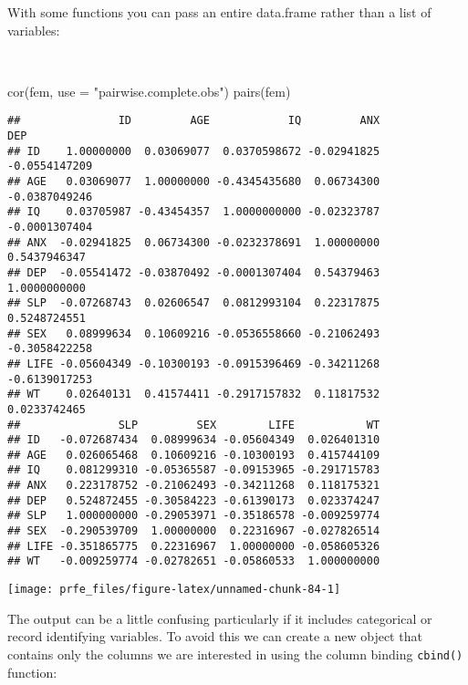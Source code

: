 \documentclass[
  12pt,
  a4paper]{book}
\newenvironment{Shaded}{\begin{snugshade}}{\end{snugshade}}
\newcommand{\AttributeTok}[1]{\textcolor[rgb]{0.77,0.63,0.00}{#1}}
\newcommand{\FunctionTok}[1]{\textcolor[rgb]{0.00,0.00,0.00}{#1}}
\newcommand{\NormalTok}[1]{#1}
\newcommand{\StringTok}[1]{\textcolor[rgb]{0.31,0.60,0.02}{#1}}
\begin{document}
\newpage

With some functions you can pass an entire data.frame rather than a list of variables:

~

\begin{Shaded}
\begin{Highlighting}[]
\FunctionTok{cor}\NormalTok{(fem, }\AttributeTok{use =} \StringTok{"pairwise.complete.obs"}\NormalTok{)}
\FunctionTok{pairs}\NormalTok{(fem)}
\end{Highlighting}
\end{Shaded}

\begin{verbatim}
##               ID         AGE            IQ         ANX           DEP
## ID    1.00000000  0.03069077  0.0370598672 -0.02941825 -0.0554147209
## AGE   0.03069077  1.00000000 -0.4345435680  0.06734300 -0.0387049246
## IQ    0.03705987 -0.43454357  1.0000000000 -0.02323787 -0.0001307404
## ANX  -0.02941825  0.06734300 -0.0232378691  1.00000000  0.5437946347
## DEP  -0.05541472 -0.03870492 -0.0001307404  0.54379463  1.0000000000
## SLP  -0.07268743  0.02606547  0.0812993104  0.22317875  0.5248724551
## SEX   0.08999634  0.10609216 -0.0536558660 -0.21062493 -0.3058422258
## LIFE -0.05604349 -0.10300193 -0.0915396469 -0.34211268 -0.6139017253
## WT    0.02640131  0.41574411 -0.2917157832  0.11817532  0.0233742465
##               SLP         SEX        LIFE           WT
## ID   -0.072687434  0.08999634 -0.05604349  0.026401310
## AGE   0.026065468  0.10609216 -0.10300193  0.415744109
## IQ    0.081299310 -0.05365587 -0.09153965 -0.291715783
## ANX   0.223178752 -0.21062493 -0.34211268  0.118175321
## DEP   0.524872455 -0.30584223 -0.61390173  0.023374247
## SLP   1.000000000 -0.29053971 -0.35186578 -0.009259774
## SEX  -0.290539709  1.00000000  0.22316967 -0.027826514
## LIFE -0.351865775  0.22316967  1.00000000 -0.058605326
## WT   -0.009259774 -0.02782651 -0.05860533  1.000000000
\end{verbatim}

\newpage

\begin{center}\texttt{[image: prfe\_files/figure-latex/unnamed-chunk-84-1]} \end{center}

The output can be a little confusing particularly if it includes categorical or record identifying variables. To avoid this we can create a new object that contains only the columns we are interested in using the column binding \texttt{cbind()} function:
\end{document}

